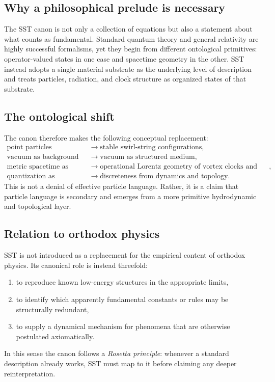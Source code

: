 \documentclass[11pt]{article}
\theoremstyle{definition}
\theoremstyle{plain}
\theoremstyle{remark}
\begin{document}
    \subsection{Why a philosophical prelude is necessary}
        The SST canon is not only a collection of equations but also a statement about what counts as fundamental. Standard quantum theory and general relativity are highly successful formalisms, yet they begin from different ontological primitives: operator-valued states in one case and spacetime geometry in the other. SST instead adopts a single material substrate as the underlying level of description and treats particles, radiation, and clock structure as organized states of that substrate.

    \subsection{The ontological shift}
        The canon therefore makes the following conceptual replacement:
        \begin{align}
            \text{point particles} &\longrightarrow \text{stable swirl-string configurations}, \\
            \text{vacuum as background} &\longrightarrow \text{vacuum as structured medium}, \\
            \text{metric spacetime as primitive} &\longrightarrow \text{operational Lorentz geometry of vortex clocks and torsion pulses}, \\
            \text{quantization as postulate} &\longrightarrow \text{discreteness from dynamics and topology}.
        \end{align}
        This is not a denial of effective particle language. Rather, it is a claim that particle language is secondary and emerges from a more primitive hydrodynamic and topological layer.

    \subsection{Relation to orthodox physics}
        SST is not introduced as a replacement for the empirical content of orthodox physics. Its canonical role is instead threefold:
        \begin{enumerate}
            \item to reproduce known low-energy structures in the appropriate limits,
            \item to identify which apparently fundamental constants or rules may be structurally redundant,
            \item to supply a dynamical mechanism for phenomena that are otherwise postulated axiomatically.
        \end{enumerate}
        In this sense the canon follows a \emph{Rosetta principle}: whenever a standard description already works, SST must map to it before claiming any deeper reinterpretation.
\end{document}

